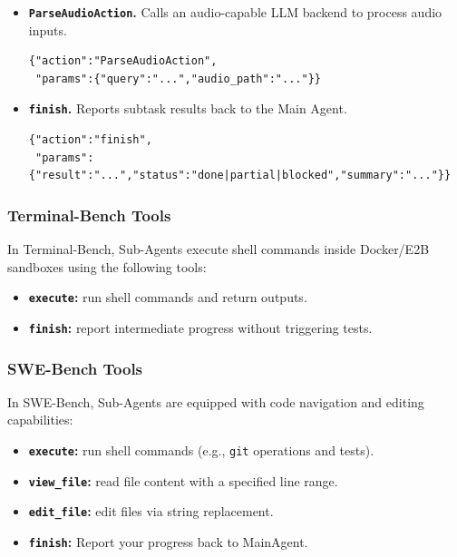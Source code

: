 \begin{itemize}
\item \textbf{\texttt{ParseAudioAction}.} Calls an audio-capable LLM backend to process audio inputs.
\begin{tcolorbox}[colback=gray!5,colframe=gray!70,arc=0mm,boxrule=1pt]
\begin{verbatim}
{"action":"ParseAudioAction",
 "params":{"query":"...","audio_path":"..."}}
\end{verbatim}
\end{tcolorbox}

\item \textbf{\texttt{finish}.} Reports subtask results back to the Main Agent.
\begin{tcolorbox}[colback=gray!5,colframe=gray!70,arc=0mm,boxrule=1pt]
\begin{verbatim}
{"action":"finish",
 "params":{"result":"...","status":"done|partial|blocked","summary":"..."}}
\end{verbatim}
\end{tcolorbox}
\end{itemize}

\subsubsection{Terminal-Bench Tools}

In Terminal-Bench, Sub-Agents execute shell commands inside Docker/E2B sandboxes using the following tools:
\begin{itemize}
    \item \textbf{\texttt{execute}:} run shell commands and return outputs.
    \item \textbf{\texttt{finish}:} report intermediate progress without triggering tests.
\end{itemize}

\subsubsection{SWE-Bench Tools}

In SWE-Bench, Sub-Agents are equipped with code navigation and editing capabilities:
\begin{itemize}
    \item \textbf{\texttt{execute}:} run shell commands (e.g., \texttt{git} operations and tests).
    \item \textbf{\texttt{view\_file}:} read file content with a specified line range.
    \item \textbf{\texttt{edit\_file}:} edit files via string replacement.
    \item \textbf{\texttt{finish}:} Report your progress back to MainAgent.
\end{itemize}

